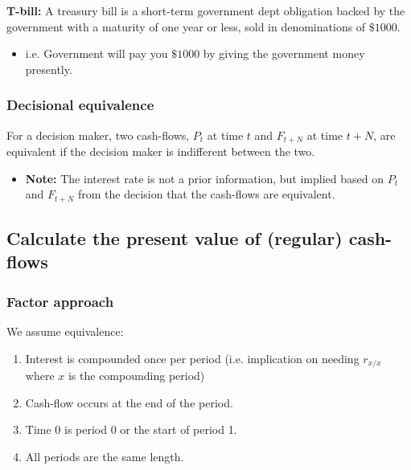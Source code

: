     \begin{definition}
        \textbf{T-bill:} A treasury bill is a short-term government dept obligation backed by the government with a maturity of one year or less, sold in denominations of $\$1000$.
        \begin{itemize}
            \item i.e. Government will pay you $\$1000$ by giving the government money presently.
        \end{itemize}
    \end{definition}

    \subsubsection{Decisional equivalence}
    \begin{definition} 
        For a decision maker, two cash-flows, \( P_t \) at time \( t \) and \( F_{t+N} \) at time \( t+N \), are equivalent if the decision maker is indifferent between the two. 
        \begin{itemize}
            \item \textbf{Note:} The interest rate is not a prior information, but implied based on \( P_t \) and \( F_{t+N} \) from the decision that the cash-flows are equivalent.
        \end{itemize}
    \end{definition}

\subsection{Calculate the present value of (regular) cash-flows}
    \subsubsection{Factor approach}
    \begin{warning}
        We assume equivalence:
        \begin{enumerate}
            \item Interest is compounded once per period (i.e. implication on needing $r_{x/x}$ where $x$ is the compounding period)
            \item Cash-flow occurs at the end of the period.
            \item Time 0 is period 0 or the start of period 1.
            \item All periods are the same length.
        \end{enumerate}
    \end{warning}

